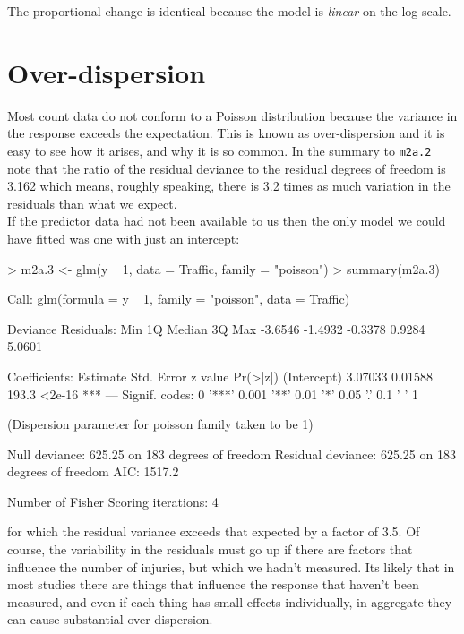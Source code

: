 \documentclass{article}
\begin{document}
The proportional change is identical because the model is \emph{linear} on the log scale.

\section{Over-dispersion}  

Most count data do not conform to a Poisson distribution because the variance in the response exceeds the expectation. This is known as over-dispersion and it is easy to see how it arises, and why it is so common. In the summary to \texttt{m2a.2} note that the ratio of the residual deviance to the residual degrees of freedom is 3.162 which means, roughly speaking, there is 3.2 times as much variation in the residuals than what we expect.\\

If the predictor data had not been available to us then the only model we could have fitted was one with just an intercept: 

\begin{Schunk}
\begin{Sinput}
> m2a.3 <- glm(y ~ 1, data = Traffic, family = "poisson")
> summary(m2a.3)
\end{Sinput}
\begin{Soutput}
Call:
glm(formula = y ~ 1, family = "poisson", data = Traffic)

Deviance Residuals: 
    Min       1Q   Median       3Q      Max  
-3.6546  -1.4932  -0.3378   0.9284   5.0601  

Coefficients:
            Estimate Std. Error z value Pr(>|z|)    
(Intercept)  3.07033    0.01588   193.3   <2e-16 ***
---
Signif. codes:  0 '***' 0.001 '**' 0.01 '*' 0.05 '.' 0.1 ' ' 1 

(Dispersion parameter for poisson family taken to be 1)

    Null deviance: 625.25  on 183  degrees of freedom
Residual deviance: 625.25  on 183  degrees of freedom
AIC: 1517.2

Number of Fisher Scoring iterations: 4
\end{Soutput}
\end{Schunk}

for which the residual variance exceeds that expected by a factor of 3.5. Of course, the variability in the residuals must go up if there are factors that influence the number of injuries, but which we hadn't measured. Its likely that in most studies there are things that influence the response that haven't been measured, and even if each thing has small effects individually, in aggregate they can cause substantial over-dispersion.
\end{document}
